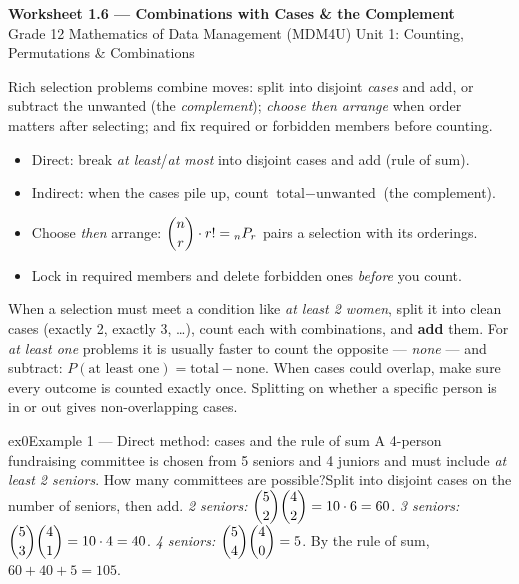 \documentclass[11pt]{article}
\begin{document}
\begin{center}
{\LARGE\bfseries\color{titleblue}Worksheet 1.6 --- Combinations with Cases \& the Complement}\\[2pt]
{\small Grade 12 Mathematics of Data Management (MDM4U) \textperiodcentered{} Unit 1: Counting, Permutations \& Combinations}
\end{center}

\begin{ideabox}
Rich selection problems combine moves: split into disjoint \emph{cases} and add, or subtract the unwanted (the \emph{complement}); \emph{choose then arrange} when order matters after selecting; and fix required or forbidden members before counting.
\begin{itemize}[leftmargin=*,itemsep=2pt]
  \item Direct: break \emph{at least}/\emph{at most} into disjoint cases and add (rule of sum).
  \item Indirect: when the cases pile up, count $\text{total}-\text{unwanted}$ (the complement).
  \item Choose \emph{then} arrange: $\dbinom{n}{r}\cdot r!={}_nP_r$ pairs a selection with its orderings.
  \item Lock in required members and delete forbidden ones \emph{before} you count.
\end{itemize}
\end{ideabox}

\begin{learnbox}
When a selection must meet a condition like \emph{at least 2 women}, split it into clean cases (exactly 2, exactly 3, \dots), count each with combinations, and \textbf{add} them.
For \emph{at least one} problems it is usually faster to count the opposite — \emph{none} — and subtract: $P(\text{at least one})=\text{total}-\text{none}$.
When cases could overlap, make sure every outcome is counted exactly once. Splitting on whether a specific person is in or out gives non-overlapping cases.
\end{learnbox}


\begin{example}{ex0}{Example 1 --- Direct method: cases and the rule of sum}
A 4-person fundraising committee is chosen from 5 seniors and 4 juniors and must include \emph{at least 2 seniors}. How many committees are possible?\soln Split into disjoint cases on the number of seniors, then add. \emph{2 seniors:} $\dbinom{5}{2}\dbinom{4}{2}=10\cdot6=60$. \emph{3 seniors:} $\dbinom{5}{3}\dbinom{4}{1}=10\cdot4=40$. \emph{4 seniors:} $\dbinom{5}{4}\dbinom{4}{0}=5$. By the rule of sum, $60+40+5=105$.
\end{example}
\end{document}
